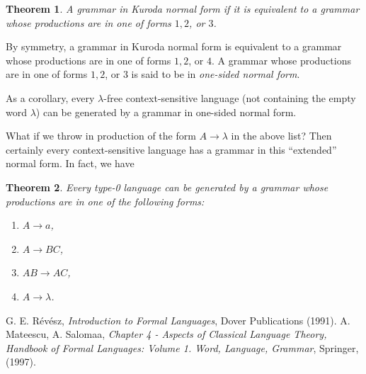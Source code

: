 \documentclass[12pt]{article}
\newtheorem{thm}{Theorem}
\begin{document}
\begin{thm} A grammar in Kuroda normal form if it is equivalent to a grammar whose productions are in one of forms $1,2$, or $3$. \end{thm}
By symmetry, a grammar in Kuroda normal form is equivalent to a grammar whose productions are in one of forms $1,2$, or $4$.  A grammar whose productions are in one of forms $1,2$, or $3$ is said to be in \emph{one-sided normal form}.

As a corollary, every $\lambda$-free context-sensitive language (not containing the empty word $\lambda$) can be generated by a grammar in one-sided normal form.

What if we throw in production of the form $A\to \lambda$ in the above list?  Then certainly every context-sensitive language has a grammar in this ``extended'' normal form.  In fact, we have
\begin{thm} Every type-0 language can be generated by a grammar whose productions are in one of the following forms:
\begin{enumerate}
\item $A\to a$,
\item $A\to BC$,
\item $AB\to AC$,
\item $A\to \lambda$.
\end{enumerate}
\end{thm}

\begin{thebibliography}{9}
 G. E. R\'{e}v\'{e}sz, {\em Introduction to Formal Languages}, Dover Publications (1991).
 A. Mateescu, A. Salomaa, {\em Chapter 4 - Aspects of Classical Language Theory, Handbook of Formal Languages: Volume 1. Word, Language, Grammar}, Springer, (1997).
\end{thebibliography}
\end{document}

